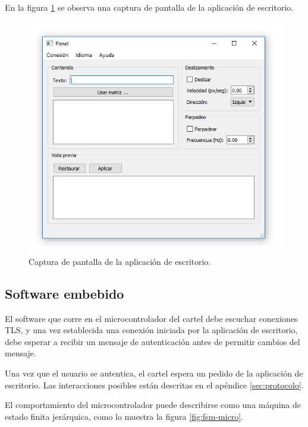 En la figura \ref{fig:screenshot-panel} se observa una captura de pantalla de la aplicación de escritorio.

\begin{figure}[ht!]
	\begin{center}
		\centering
		\includegraphics[scale=0.8]{imagenes/screenshot-panel.png}
		\caption{Captura de pantalla de la aplicación de escritorio.}
		\label{fig:screenshot-panel}
	\end{center}
\end{figure}

\subsection{Software embebido}
El software que corre en el microcontrolador del cartel debe escuchar conexiones TLS, y una vez establecida una conexión iniciada por la aplicación de escritorio, debe esperar a recibir un mensaje de autenticación antes de permitir cambios del mensaje.

Una vez que el usuario se autentica, el cartel espera un pedido de la aplicación de escritorio. Las interacciones posibles están descritas en el apéndice \ref{sec:protocolo}.

El comportamiento del microcontrolador puede describirse como una máquina de estado finita jerárquica, como lo muestra la figura \ref{fig:fsm-micro}.

